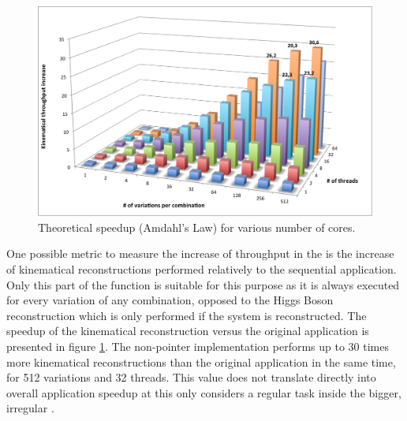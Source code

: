 \begin{figure}[!htp]
	\begin{center}
		\includegraphics[scale=0.6]{../../common/graphs/dilep_throughput.png}
		\caption{Theoretical speedup (Amdahl's Law) for various number of cores.}
		\label{fig:DilepThroughput}
	\end{center}
\end{figure}

One possible metric to measure the increase of throughput in the \ttDilepKinFit is the increase of kinematical reconstructions performed relatively to the sequential application. Only this part of the function is suitable for this purpose as it is always executed for every variation of any combination, opposed to the Higgs Boson reconstruction which is only performed if the \ttbar system is reconstructed. The speedup of the kinematical reconstruction versus the original application is presented in figure \ref{fig:DilepThroughput}. The non-pointer implementation performs up to 30 times more kinematical reconstructions than the original application in the same time, for 512 variations and 32 threads. This value does not translate directly into overall application speedup at this only considers a regular task inside the bigger, irregular \ttDilepKinFit.

